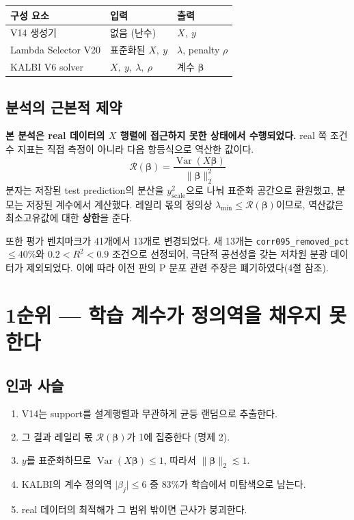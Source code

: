 \documentclass[11pt,a4paper]{article}
\theoremstyle{definition}
\newcommand{\R}{\mathcal{R}}
\newcommand{\bbeta}{\boldsymbol{\beta}}
\begin{document}
\begin{center}
\begin{tabular}{@{}lll@{}}
\toprule
\textbf{구성 요소} & \textbf{입력} & \textbf{출력}\\
\midrule
V14 생성기 & 없음 (난수) & \(X,\ y\)\\
Lambda Selector V20 & 표준화된 \(X,\ y\) & \(\lambda\), penalty \(\rho\)\\
KALBI V6 solver & \(X,\ y,\ \lambda,\ \rho\) & 계수 \(\bbeta\)\\
\bottomrule
\end{tabular}
\end{center}

\subsection{분석의 근본적 제약}

\textbf{본 분석은 real 데이터의 \(X\) 행렬에 접근하지 못한 상태에서 수행되었다.} real 쪽 조건수 지표는 직접 측정이 아니라 다음 항등식으로 역산한 값이다.
\[
\R(\bbeta)=\frac{\operatorname{Var}(X\bbeta)}{\lVert\bbeta\rVert_2^{2}}
\]
분자는 저장된 test prediction의 분산을 \(y_{\text{scale}}^2\)으로 나눠 표준화 공간으로 환원했고, 분모는 저장된 계수에서 계산했다. 레일리 몫의 정의상 \(\lambda_{\min}\le\R(\bbeta)\)이므로, 역산값은 최소고유값에 대한 \textbf{상한}을 준다.

또한 평가 벤치마크가 41개에서 13개로 변경되었다. 새 13개는 \verb|corr095_removed_pct| \(\le40\%\)와 \(0.2<R^2<0.9\) 조건으로 선정되어, 극단적 공선성을 갖는 저차원 분광 데이터가 제외되었다. 이에 따라 이전 판의 P 분포 관련 주장은 폐기하였다(4절 참조).

\section{1순위 --- 학습 계수가 정의역을 채우지 못한다}

\subsection{인과 사슬}

\begin{enumerate}[leftmargin=2.2em,itemsep=0.35em]
\item V14는 support를 설계행렬과 무관하게 균등 랜덤으로 추출한다.
\item 그 결과 레일리 몫 \(\R(\bbeta)\)가 1에 집중한다 (명제 2).
\item \(y\)를 표준화하므로 \(\operatorname{Var}(X\bbeta)\le1\), 따라서 \(\lVert\bbeta\rVert_2\lesssim1\).
\item KALBI의 계수 정의역 \(\lvert\beta_j\rvert\le6\) 중 \(83\%\)가 학습에서 미탐색으로 남는다.
\item real 데이터의 최적해가 그 범위 밖이면 근사가 붕괴한다.
\end{enumerate}
\end{document}
